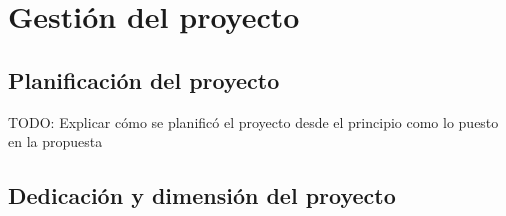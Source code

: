 \chapter{Gestión del proyecto}

\section{Planificación del proyecto}


TODO: Explicar cómo se planificó el proyecto desde el principio como lo puesto en la propuesta \\

\section{Dedicación y dimensión del proyecto}


